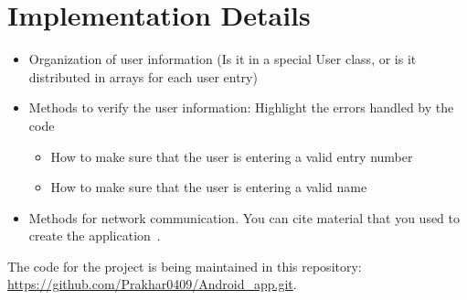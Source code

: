 \documentclass[12pt]{article}
\begin{document}
\section{Implementation Details}

\begin{itemize}
\item Organization of user information (Is it in a special User class, or is it distributed in arrays for each user entry)
\item Methods to verify the user information: Highlight the errors handled by the code
	\begin{itemize}
		\item How to make sure that the user is entering a valid entry number
		\item How to make sure that the user is entering a valid name
	\end{itemize}
\item Methods for network communication. You can cite material that you used to create the application~\cite{android_network_tutorial}.
\end{itemize}

The code for the project is being maintained in this repository: \url{ https://github.com/Prakhar0409/Android\_app.git}.



\end{document}
